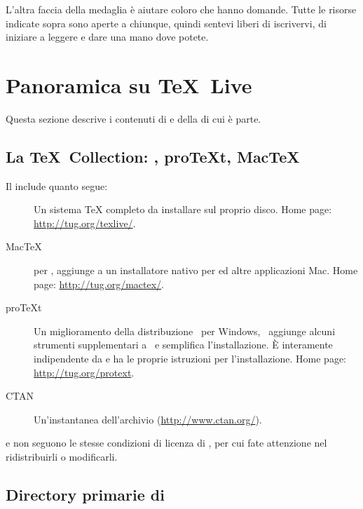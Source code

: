 \documentclass{article}
\begin{document}
L'altra faccia della medaglia è aiutare coloro che hanno domande. Tutte le
risorse indicate sopra sono aperte a chiunque, quindi sentevi liberi di
iscrivervi, di iniziare a leggere e dare una mano dove potete.

\section{Panoramica su \protect\TeX\protect\ Live}
\label{sec:overview-tl}

Questa sezione descrive i contenuti di \TL{} e della \TK{} di cui è parte.

\subsection{La \protect\TeX\protect\ Collection: \protect\TL,
            pro\protect\TeX{}t, Mac\protect\TeX}
\label{sec:tl-coll-dists}

Il \DVD{} \TK{} include quanto segue:

\begin{description}

\item [\TL] Un sistema \TeX{} completo da installare sul proprio disco. Home
  page: \url{http://tug.org/texlive/}.

\item [Mac\TeX] per \MacOSX, aggiunge a \TL{} un installatore nativo per \MacOSX
  ed altre applicazioni Mac. Home page: \url{http://tug.org/mactex/}.

\item [pro\TeX{}t] Un miglioramento della distribuzione \MIKTEX\ per
  Windows, \ProTeXt\ aggiunge alcuni strumenti supplementari a \MIKTEX\ e
  semplifica l'installazione. È interamente indipendente da \TL{} e ha le
  proprie istruzioni per l'installazione. Home page:
  \url{http://tug.org/protext}.  

\item [CTAN] Un'instantanea dell'archivio \CTAN{}
  (\url{http://www.ctan.org/}).

\end{description}

\CTAN{} e  non seguono le stesse condizioni di licenza di
\TL{}, per cui fate attenzione nel ridistribuirli o modificarli.


\subsection{Directory primarie di \protect\TL{}}
\label{sec:tld}
\end{document}
